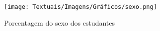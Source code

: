 \begin{figure}[ht!]
    \centering
    \caption{Porcentagem do sexo dos estudantes}
    \texttt{[image: Textuais/Imagens/Gráficos/sexo.png]}
    \label{fig:sexo-porcent}
\end{figure}






